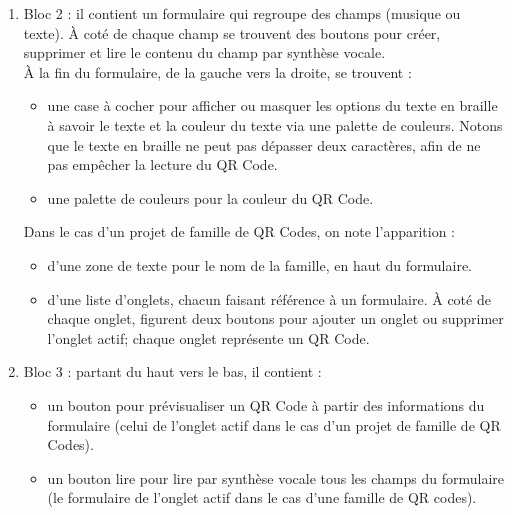 \begin{enumerate}
\item Bloc 2 : il contient un formulaire qui regroupe des champs (musique ou texte). À coté de chaque champ se trouvent des boutons pour créer, supprimer et lire le contenu du champ par synthèse vocale.\\
À la fin du formulaire, de la gauche vers la droite, se trouvent :
	\begin{itemize}
	\item une case à cocher pour afficher ou masquer les options du texte en braille à savoir le texte et la couleur du texte via une palette de couleurs. Notons que le texte en braille ne peut pas dépasser deux caractères, afin de ne pas empêcher la lecture du QR Code.
	\item une palette de couleurs pour la couleur du QR Code.
	\end{itemize}
Dans le cas d'un projet de famille de QR Codes, on note l'apparition :
	\begin{itemize}
	\item d'une zone de texte pour le nom de la famille, en haut du formulaire.
	\item d'une liste d'onglets, chacun faisant référence à un formulaire. À coté de chaque onglet, figurent deux boutons pour ajouter un onglet ou supprimer l'onglet actif; chaque onglet représente un QR Code.
	\end{itemize}
	
\item Bloc 3 : partant du haut vers le bas, il contient : 
	\begin{itemize}
	\item un bouton pour prévisualiser un QR Code à partir des informations du formulaire (celui de l'onglet actif dans le cas d'un projet de famille de QR Codes).
	\item un bouton lire pour lire par synthèse vocale tous les champs du formulaire (le formulaire de l'onglet actif dans le cas d'une famille de QR codes).
	\end{itemize}

\end{enumerate}
